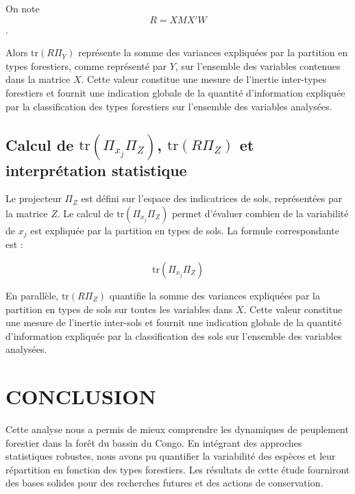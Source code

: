 \documentclass[
]{article}
\begin{document}
On note \[ R = X M X' W \].

Alors \(\text{tr}(R \Pi_Y)\) représente la somme des variances
expliquées par la partition en types forestiers, comme représenté par
\(Y\), sur l'ensemble des variables contenues dans la matrice \(X\).
Cette valeur constitue une mesure de l'inertie inter-types forestiers et
fournit une indication globale de la quantité d'information expliquée
par la classification des types forestiers sur l'ensemble des variables
analysées.

\hypertarget{calcul-de-texttrpi_x_j-pi_z-texttrr-pi_z-et-interpruxe9tation-statistique}{%
\subsection{\texorpdfstring{Calcul de \(\text{tr}(\Pi_{x_j} \Pi_Z)\),
\(\text{tr}(R \Pi_Z)\) et interprétation
statistique}{Calcul de \textbackslash text\{tr\}(\textbackslash Pi\_\{x\_j\} \textbackslash Pi\_Z), \textbackslash text\{tr\}(R \textbackslash Pi\_Z) et interprétation statistique}}\label{calcul-de-texttrpi_x_j-pi_z-texttrr-pi_z-et-interpruxe9tation-statistique}}

Le projecteur \(\Pi_Z\) est défini sur l'espace des indicatrices de
sols, représentées par la matrice \(Z\). Le calcul de
\(\text{tr}(\Pi_{x_j} \Pi_Z)\) permet d'évaluer combien de la
variabilité de \(x_j\) est expliquée par la partition en types de sols.
La formule correspondante est :

\[
\text{tr}(\Pi_{x_j} \Pi_Z)
\]

En parallèle, \(\text{tr}(R \Pi_Z)\) quantifie la somme des variances
expliquées par la partition en types de sols sur toutes les variables
dans \(X\). Cette valeur constitue une mesure de l'inertie inter-sols et
fournit une indication globale de la quantité d'information expliquée
par la classification des sols sur l'ensemble des variables analysées.

\hypertarget{conclusion}{%
\section{CONCLUSION}\label{conclusion}}

Cette analyse nous a permis de mieux comprendre les dynamiques de
peuplement forestier dans la forêt du bassin du Congo. En intégrant des
approches statistiques robustes, nous avons pu quantifier la variabilité
des espèces et leur répartition en fonction des types forestiers. Les
résultats de cette étude fourniront des bases solides pour des
recherches futures et des actions de conservation.
\end{document}
